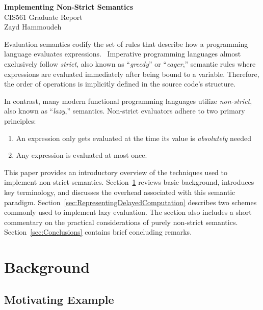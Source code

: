 \documentclass[11pt]{article}
\begin{document}
\begin{center}
  \textbf{\Large Implementing Non-Strict Semantics}\\\vspace{3pt}
  {\large CIS561 Graduate Report}\\\vspace{3pt}
  Zayd Hammoudeh
\end{center}

Evaluation semantics codify the set of rules that describe how a programming language evaluates expressions.~\cite{hoover:Notes}  Imperative programming languages almost exclusively follow \textit{strict}, also known as ``\textit{greedy}'' or ``\textit{eager},'' semantic rules where expressions are evaluated immediately after being bound to a variable.  Therefore, the order of operations is implicitly defined in the source code's structure.

In contrast, many modern functional programming languages utilize \textit{non-strict}, also known as ``\textit{lazy},'' semantics. Non-strict evaluators adhere to two primary principles:~\cite{Henderson:1976}

\begin{enumerate}
  \item An expression only gets evaluated at the time its value is \textit{absolutely} needed
  \item Any expression is evaluated at most once.
\end{enumerate}

This paper provides an introductory overview of the techniques used to implement non-strict semantics. Section~\ref{sec:Background} reviews basic background, introduces key terminology, and discusses the overhead associated with this semantic paradigm.  Section~\ref{sec:RepresentingDelayedComputation} describes two schemes commonly used to implement lazy evaluation.  The section also includes a short commentary on the practical considerations of purely non-strict semantics.  Section~\ref{sec:Conclusions} contains brief concluding remarks.

\section{Background}\label{sec:Background}

\subsection{Motivating Example}\label{sec:MotivatingExample}
\end{document}
